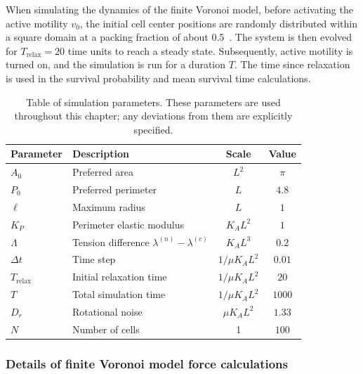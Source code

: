 When simulating the dynamics of the finite Voronoi model, before activating the active motility $v_0$, the initial cell center positions are randomly distributed within a square domain at a packing fraction of about 0.5~\cite{huang2023bridging}. The system is then evolved for $T_\textrm{relax}=20$ time units to reach a steady state. Subsequently, active motility is turned on, and the simulation is run for a duration $T$.
The time since relaxation is used in the survival probability and mean survival time calculations.

\begin{table}[ht]
\centering
\caption[Default parameters of the finite Voronoi simulations]{Table of simulation parameters. These parameters are used throughout this chapter; any deviations from them are explicitly specified.}
\label{tab:ch4:params}
\begin{tabular}{llcc}
\toprule\toprule
Parameter & \quad Description & Scale & Value\\\midrule
$A_0$ & Preferred area & $L^2$ & $\pi$\\
$P_0$ & Preferred perimeter & $L$ & $4.8$\\
$\ell$ & Maximum radius & $L$ & $1$\\
$K_P$ & Perimeter elastic modulus & $K_A L^2$ & $1$\\
$\Lambda$ & Tension difference $\lambda^{(n)}-\lambda^{(c)}$ & $K_A L^3$ & $0.2$\\
$\Delta t$ & Time step & $1/\mu K_A L^2$ & $0.01$\\
$T_\textrm{relax}$ & Initial relaxation time& $1/\mu K_A L^2$ & $20$\\
$T$ & Total simulation time & $1/\mu K_A L^2$ & $1000$\\
$D_r$ & Rotational noise & $\mu K_A L^2$ & $1.33$\\
$N$ & Number of cells & 1 & $100$\\
\bottomrule\bottomrule
\end{tabular}
\end{table}

\subsubsection{Details of finite Voronoi model force calculations}

